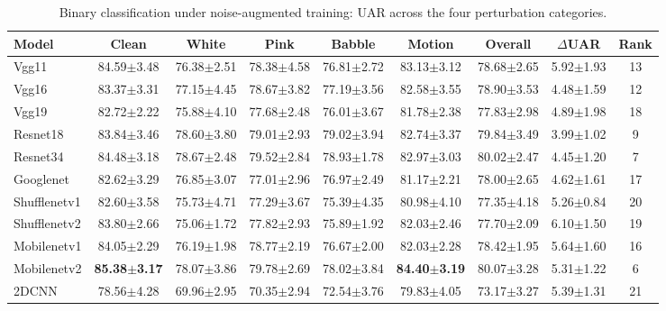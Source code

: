 \begin{table}[H]
\centering\color{black}
\caption{Binary classification under noise-augmented training: UAR across the four perturbation categories.}\label{tab:supp_all_models_binary}
\begingroup
\fontsize{8.0}{9.2}\selectfont
\setlength{\tabcolsep}{1.4pt}\renewcommand{\arraystretch}{1.0}
\begin{tabular*}{\linewidth}{@{\extracolsep{\fill}}lcccccccc@{}}\toprule
\textbf{Model} & \textbf{Clean} & \textbf{White} & \textbf{Pink} & \textbf{Babble} & \textbf{Motion} & \textbf{Overall} & \textbf{$\Delta$UAR} & \textbf{Rank}\\\midrule
Vgg11 & 84.59$\pm$3.48 & 76.38$\pm$2.51 & 78.38$\pm$4.58 & 76.81$\pm$2.72 & 83.13$\pm$3.12 & 78.68$\pm$2.65 & 5.92$\pm$1.93 & 13\\
Vgg16 & 83.37$\pm$3.31 & 77.15$\pm$4.45 & 78.67$\pm$3.82 & 77.19$\pm$3.56 & 82.58$\pm$3.55 & 78.90$\pm$3.53 & 4.48$\pm$1.59 & 12\\
Vgg19 & 82.72$\pm$2.22 & 75.88$\pm$4.10 & 77.68$\pm$2.48 & 76.01$\pm$3.67 & 81.78$\pm$2.38 & 77.83$\pm$2.98 & 4.89$\pm$1.98 & 18\\
Resnet18 & 83.84$\pm$3.46 & 78.60$\pm$3.80 & 79.01$\pm$2.93 & 79.02$\pm$3.94 & 82.74$\pm$3.37 & 79.84$\pm$3.49 & 3.99$\pm$1.02 & 9\\
Resnet34 & 84.48$\pm$3.18 & 78.67$\pm$2.48 & 79.52$\pm$2.84 & 78.93$\pm$1.78 & 82.97$\pm$3.03 & 80.02$\pm$2.47 & 4.45$\pm$1.20 & 7\\
Googlenet & 82.62$\pm$3.29 & 76.85$\pm$3.07 & 77.01$\pm$2.96 & 76.97$\pm$2.49 & 81.17$\pm$2.21 & 78.00$\pm$2.65 & 4.62$\pm$1.61 & 17\\
\midrule
Shufflenetv1 & 82.60$\pm$3.58 & 75.73$\pm$4.71 & 77.29$\pm$3.67 & 75.39$\pm$4.35 & 80.98$\pm$4.10 & 77.35$\pm$4.18 & 5.26$\pm$0.84 & 20\\
Shufflenetv2 & 83.80$\pm$2.66 & 75.06$\pm$1.72 & 77.82$\pm$2.93 & 75.89$\pm$1.92 & 82.03$\pm$2.46 & 77.70$\pm$2.09 & 6.10$\pm$1.50 & 19\\
Mobilenetv1 & 84.05$\pm$2.29 & 76.19$\pm$1.98 & 78.77$\pm$2.19 & 76.67$\pm$2.00 & 82.03$\pm$2.28 & 78.42$\pm$1.95 & 5.64$\pm$1.60 & 16\\
Mobilenetv2 & \textbf{85.38$\pm$3.17} & 78.07$\pm$3.86 & 79.78$\pm$2.69 & 78.02$\pm$3.84 & \textbf{84.40$\pm$3.19} & 80.07$\pm$3.28 & 5.31$\pm$1.22 & 6\\
\midrule
2DCNN~\cite{2DCNN} & 78.56$\pm$4.28 & 69.96$\pm$2.95 & 70.35$\pm$2.94 & 72.54$\pm$3.76 & 79.83$\pm$4.05 & 73.17$\pm$3.27 & 5.39$\pm$1.31 & 21\\

\end{tabular*}
\end{table}
